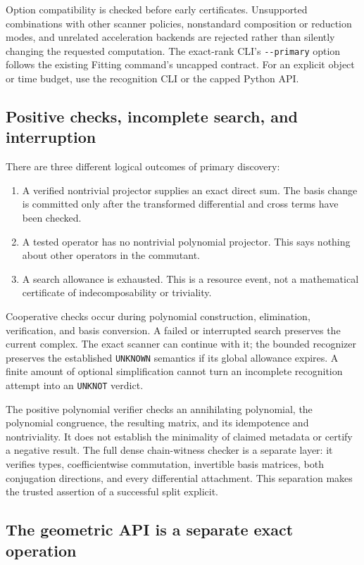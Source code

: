 \documentclass[11pt,a4paper]{article}
\theoremstyle{definition}\newtheorem{definition}[theorem]{Definition}
\theoremstyle{remark}\newtheorem{remark}[theorem]{Remark}
\newcommand{\code}[1]{\nolinkurl{#1}}
\begin{document}
Option compatibility is checked before early certificates. Unsupported
combinations with other scanner policies, nonstandard composition or
reduction modes, and unrelated acceleration backends are rejected rather
than silently changing the requested computation. The exact-rank CLI's
\code{--primary} option follows the existing Fitting command's uncapped
contract. For an explicit object or time budget, use the recognition CLI or
the capped Python API.

\subsection{Positive checks, incomplete search, and interruption}

There are three different logical outcomes of primary discovery:
\begin{enumerate}
\item A verified nontrivial projector supplies an exact direct sum. The
basis change is committed only after the transformed differential and
cross terms have been checked.
\item A tested operator has no nontrivial polynomial projector. This says
nothing about other operators in the commutant.
\item A search allowance is exhausted. This is a resource event, not a
mathematical certificate of indecomposability or triviality.
\end{enumerate}

Cooperative checks occur during polynomial construction, elimination,
verification, and basis conversion. A failed or interrupted search preserves
the current complex. The exact scanner can continue with it; the bounded
recognizer preserves the established \code{UNKNOWN} semantics if its global
allowance expires. A finite amount of optional simplification cannot turn
an incomplete recognition attempt into an \code{UNKNOT} verdict.

The positive polynomial verifier checks an annihilating polynomial, the
polynomial congruence, the resulting matrix, and its idempotence and
nontriviality. It does not establish the minimality of claimed metadata or
certify a negative result. The full dense chain-witness checker is a
separate layer: it verifies types, coefficientwise commutation, invertible
basis matrices, both conjugation directions, and every differential
attachment. This separation makes the trusted assertion of a successful
split explicit.

\subsection{The geometric API is a separate exact operation}
\end{document}
